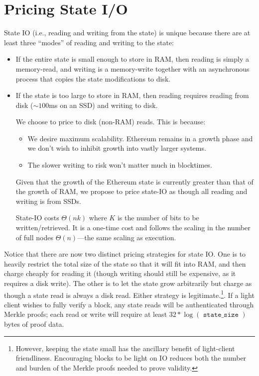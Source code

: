 \documentclass[12pt, final]{article}
\newcommand{\tt}[1]{{\texttt{ #1 }}}
\begin{document}

\section{Pricing State I/O}
\label{sect:io}
State IO (i.e., reading and writing from the state) is unique because there are at least three ``modes'' of reading and writing to the state:

\begin{itemize}
\item If the entire state is small enough to store in RAM, then reading is simply a memory-read, and writing is a memory-write together with an asynchronous process that copies the state modifications to disk.

\item If the state is too large to store in RAM, then reading requires reading from disk ($\sim\!\!100$ms on an SSD) and writing to disk. 


We choose to price to disk (non-RAM) reads.  This is because:
\begin{itemize}
\item We desire maximum scalability.  Ethereum remains in a growth phase and we don't wish to inhibit growth into vastly larger systems.
\item The slower writing to risk won't matter much in blocktimes.
\end{itemize}

Given that the growth of the Ethereum state is currently greater than that of the growth of RAM, we propose to price state-IO as though all reading and writing is from SSDs.

State-IO costs $\Theta(n k)$ where $K$ is the number of bits to be written/retrieved.  It is a one-time cost and follows the scaling in the number of full nodes $\Theta(n)$---the same scaling as execution.

\end{itemize}

Notice that there are now two distinct pricing strategies for state IO. One is to heavily restrict the total size of the state so that it will fit into RAM, and then charge cheaply for reading it (though writing should still be expensive, as it requires a disk write). The other is to let the state grow arbitrarily but charge as though a state read is always a disk read. Either strategy is legitimate.\footnote{However, keeping the state small has the ancillary benefit of light-client friendliness.  Encouraging blocks to be light on IO reduces both the number and burden of the Merkle proofs needed to prove validity.}.  If a light client wishes to fully verify a block, any state reads will be authenticated through Merkle proofs; each read or write will require at least $32 * \log(\tt{state\_size})$ bytes of proof data. 
\end{document}
